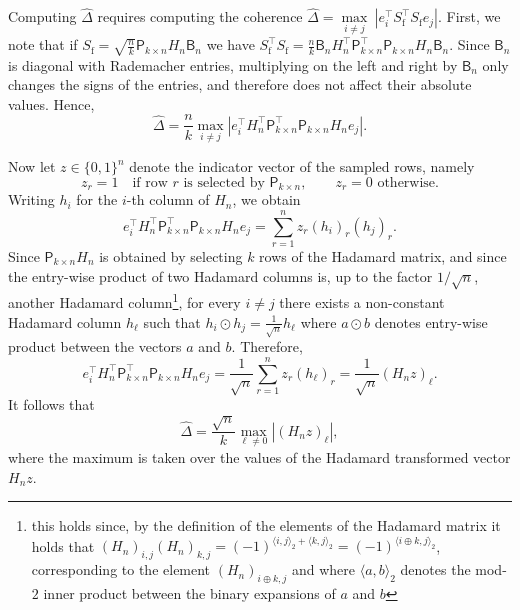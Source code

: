 \documentclass[11pt]{article}
\theoremstyle{definition}
\theoremstyle{plain}
\newcommand{\abs}[1]{\left| #1 \right|}
\begin{document}
    Computing $\widehat{\Delta}$ requires computing the coherence $\widehat{\Delta} = \underset{i\neq j}{\max}\ \abs{e^{\top}_i S_{\mathrm{f}}^{\top}S_{\mathrm{f}}e_j}.$ First, we note that if $S_{\mathrm{f}} = \sqrt{\frac{n}{k}} \mathsf{P}_{k\times n}H_n\mathsf{B}_n$ we have $S_{\mathrm{f}}^{\top}S_{\mathrm{f}} = \frac{n}{k} \mathsf{B}_n H_n^{\top}\mathsf{P}^{\top}_{k\times n}\mathsf{P}_{k\times n}H_n\mathsf{B}_n.$ Since $\mathsf{B}_n$ is diagonal with Rademacher entries, multiplying on the left and right by $\mathsf{B}_n$ only changes the signs of the entries, and therefore does not affect their absolute values. Hence,
    \begin{equation}
        \widehat{\Delta} = \frac{n}{k} \max_{i\neq j} \abs{e^{\top}_i H_n^{\top}\mathsf{P}^{\top}_{k\times n}\mathsf{P}_{k\times n}H_n e_j}.
    \end{equation}
    
    Now let $z\in\{0,1\}^n$ denote the indicator vector of the sampled rows, namely
    \begin{equation}
        z_r = 1 \quad\text{if row }r\text{ is selected by }\mathsf{P}_{k\times n}, \qquad z_r = 0 \text{ otherwise.}
    \end{equation}
    Writing $h_i$ for the $i$-th column of $H_n$, we obtain
    \begin{equation}
        e^{\top}_i H_n^{\top}\mathsf{P}^{\top}_{k\times n}\mathsf{P}_{k\times n}H_n e_j = \sum_{r=1}^n z_r (h_i)_r (h_j)_r.
    \end{equation}
    Since $\mathsf{P}_{k\times n}H_n$ is obtained by selecting $k$ rows of the Hadamard matrix, and since the entry-wise product of two Hadamard columns is, up to the factor $1/\sqrt{n}$, another Hadamard column\footnote{this holds since, by the definition of the elements of the Hadamard matrix it holds that $(H_n)_{i,j}(H_n)_{k,j} = (-1)^{\langle i,j\rangle_2 + \langle k,j\rangle_2} = (-1)^{\langle i\oplus k,j\rangle_2}$, corresponding to the element $(H_n)_{i\oplus k, j}$ and where $\langle a, b\rangle_2$ denotes the mod-$2$ inner product between the binary expansions of $a$ and $b$}, for every $i\neq j$ there exists a non-constant Hadamard column $h_\ell$ such that $h_i \odot h_j = \frac{1}{\sqrt{n}} h_\ell$ where $a \odot b$ denotes entry-wise product between the vectors $a$ and $b$. Therefore,
    \begin{equation}
        e^{\top}_i H_n^{\top}\mathsf{P}^{\top}_{k\times n}\mathsf{P}_{k\times n}H_n e_j = \frac{1}{\sqrt{n}} \sum_{r=1}^n z_r (h_\ell)_r = \frac{1}{\sqrt{n}} (H_n z)_\ell.
    \end{equation}
    It follows that
    \begin{equation}
        \widehat{\Delta} = \frac{\sqrt{n}}{k} \max_{\ell \neq 0} \abs{(H_n z)_\ell},
    \end{equation}
    where the maximum is taken over the values of the Hadamard transformed vector $H_nz$.
    
\end{document}
